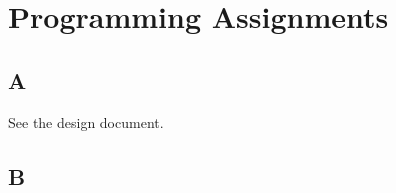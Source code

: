 \documentclass[12pt]{article}
\begin{document}
\maketitle

\section{Programming Assignments}

    \subsection{A}

        See the design document.
    
    \subsection{B}
\end{document}
